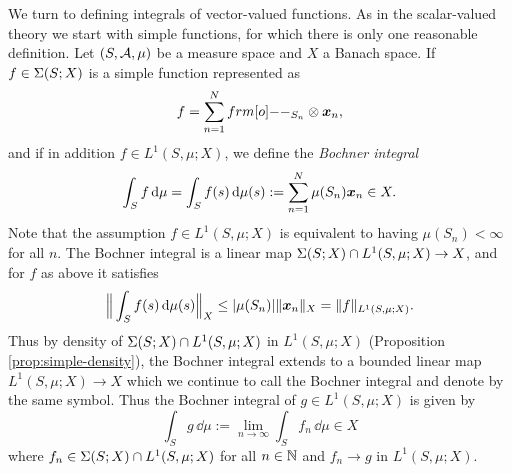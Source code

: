 We turn to defining integrals of vector-valued functions.
As in the scalar-valued theory we start with simple functions, for which there is only one reasonable definition.
Let $(S,\mathcal{A},\mu)$ be a measure space and $X$ a Banach space.
If $f \in \Sigma(S;X)$ is a simple function represented as
\begin{equation*}
  f = \sum_{n=1}^N \1_{S_n} \otimes \mb{x}_n ,
\end{equation*}
and if in addition $f \in L^1(S,\mu;X)$, we define the \emph{Bochner integral}
\begin{equation*}
  \int_S f \, \mathrm{d}\mu = \int_S f(s) \, \mathrm{d} \mu(s) := \sum_{n=1}^N \mu(S_n) \bm{x}_n \in X.
\end{equation*}
Note that the assumption $f \in L^1(S,\mu;X)$ is equivalent to having $\mu(S_n) < \infty$ for all $n$.
The Bochner integral is a linear map $\Sigma(S;X) \cap L^1(S,\mu;X) \to X$, and for $f$ as above it satisfies
\begin{equation*}
  \Big\| \int_S f(s) \, \mathrm{d} \mu(s) \Big\|_X \leq |\mu(S_n)| \|\bm{x}_n\|_X = \|f\|_{L^1(S,\mu;X)}.
\end{equation*}
Thus by density of $\Sigma(S;X) \cap L^1(S,\mu;X)$ in $L^1(S,\mu;X)$ (Proposition \ref{prop:simple-density}), the Bochner integral extends to a bounded linear map $L^1(S,\mu;X) \to X$ which we continue to call the Bochner integral and denote by the same symbol.
Thus the Bochner integral of $g \in L^1(S,\mu;X)$ is given by 
\begin{equation*}
  \int_S g \, \dd\mu := \lim_{n \to \infty} \int_S f_n \, \dd\mu \in X
\end{equation*}
where $f_n \in \Sigma(S;X) \cap L^1(S,\mu;X)$ for all $n \in \mathbb{N}$ and $f_n \to g$ in $L^1(S,\mu;X)$.

